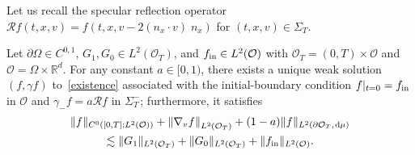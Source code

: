 \documentclass[AHL,Unicode,longabstracts,published]{cedram}
\newcommand*{\dif}{\mathop{}\!\mathrm{d}}
\newcommand*\p{\partial}
\newcommand*\fin {f_{\rm in}}
\newcommand*\R {\mathbb{R}}
\newcommand*\RR {\mathcal{R}}
\newcommand*\OO {\mathcal{O}}
\begin{document}
Let us recall the specular reflection operator $\RR f(t,x,v)=f(t,x,v-2(n_x\cdot v)\;\!n_x)$ for $(t,x,v)\in\Sigma_T$.

\begin{lemm}\label{a01}
Let $\p\Omega\in C^{0,1}$, $G_1,G_0\in L^2(\OO_T)$, and $\fin\in L^2(\OO)$ with $\OO_T=(0,T)\times\OO$ and $\OO=\Omega\times\R^d$. For any constant $a\in[0,1)$, there exists a unique weak solution $(f,\gamma f)$ to~\eqref{existence} associated with the initial-boundary condition $f|_{t=0}=\fin$ in $\OO$ and $\gamma_-f=a\RR f$ in $\Sigma_T^-$; furthermore, it satisfies
\begin{multline}\label{dra}
\|f\|_{C^0\left([0,T];L^2(\OO)\right )} +\left\|\nabla_vf\right\|_{L^2(\OO_T)} +(1-a)\|f\|_{L^2\left(\p\OO_T,\;\!\dif\mu\right)}\\
\lesssim \|G_1\|_{L^2(\OO_T)} + \|G_0\|_{L^2(\OO_T)} + \|\fin\|_{L^2(\OO)} .
\end{multline}
\end{lemm}
\end{document}
